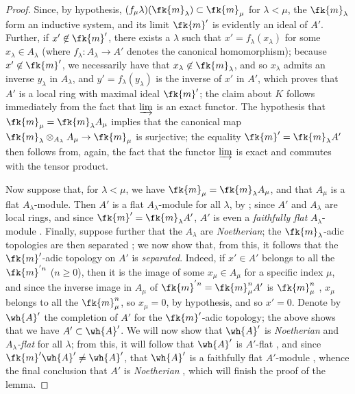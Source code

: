 \begin{proof}
\label{proof-0.10.3.1.3}
Since, by hypothesis, $(f_\mu\lambda)(\fk{m}_\lambda)\subset\fk{m}_\mu$ for $\lambda<\mu$, the $\fk{m}_\lambda$ form an inductive system, and its limit $\fk{m}'$ is evidently an ideal of $A'$.
Further, if $x'\not\in\fk{m}'$, there exists a $\lambda$ such that $x'=f_\lambda(x_\lambda)$ for some $x_\lambda\in A_\lambda$ (where $f_\lambda:A_\lambda\to A'$ denotes the canonical homomorphism);
because $x'\not\in\fk{m}'$, we necessarily have that $x_\lambda\not\in\fk{m}_\lambda$, and so $x_\lambda$ admits an inverse $y_\lambda$ in $A_\lambda$, and $y'=f_\lambda(y_\lambda)$ is the inverse of $x'$ in $A'$, which proves that $A'$ is a local ring with maximal ideal $\fk{m}'$;
the claim about $K$ follows immediately from the fact that $\varinjlim$ is an exact functor.
The hypothesis that $\fk{m}_\mu=\fk{m}_\lambda A_\mu$ implies that the canonical map $\fk{m}_\lambda\otimes_{A_\lambda}A_\mu\to\fk{m}_\mu$ is surjective;
the equality $\fk{m}'=\fk{m}_\lambda A'$ then follows from, again, the fact that the functor $\varinjlim$ is exact and commutes with the tensor product.

Now suppose that, for $\lambda<\mu$, we have $\fk{m}_\mu=\fk{m}_\lambda A_\mu$, and that $A_\mu$ is a flat $A_\lambda$-module.
Then $A'$ is a flat $A_\lambda$-module for all $\lambda$, by ;
since $A'$ and $A_\lambda$ are local rings, and since $\fk{m}'=\fk{m}_\lambda A'$, $A'$ is even a \emph{faithfully flat} $A_\lambda$-module .
Finally, suppose further that the $A_\lambda$ are \emph{Noetherian};
the $\fk{m}_\lambda$-adic topologies are then separated ;
we now show that, from this, it follows that the $\fk{m}'$-adic topology on $A'$ is \emph{separated}.
Indeed, if $x'\in A'$ belongs to all the $\fk{m}^{'n}$ ($n\geq0$), then it is the image of some $x_\mu\in A_\mu$ for a specific index $\mu$, and since the inverse image in $A_\mu$ of $\fk{m}^{'n}=\fk{m}_\mu^n A'$ is $\fk{m}_\mu^n$ , $x_\mu$ belongs to all the $\fk{m}_\mu^n$, so $x_\mu=0$, by hypothesis, and so $x'=0$.
Denote by $\wh{A}'$ the completion of $A'$ for the $\fk{m}'$-adic topology;
the above shows that we have $A'\subset\wh{A}'$.
We will now show that $\wh{A}'$ is \emph{Noetherian} and \emph{$A_\lambda$-flat} for all $\lambda$;
from this,
it will follow that $\wh{A}'$ is $A'$-flat , and since $\fk{m}'\wh{A}'\neq\wh{A}'$, that $\wh{A}'$ is a faithfully flat $A'$-module , whence the final conclusion that $A'$ is \emph{Noetherian} , which will finish the proof of the lemma.


\end{proof}
